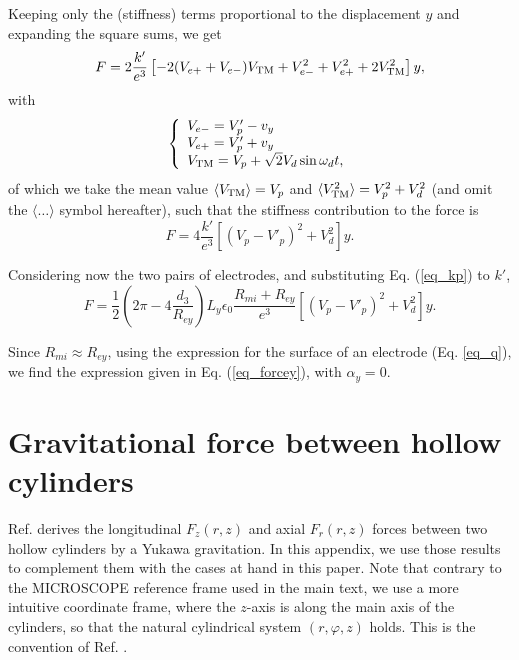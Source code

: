 \documentclass[12pt]{iopart}
\begin{document}
Keeping only the (stiffness) terms proportional to the displacement $y$ and expanding the square sums, we get
\begin{equation}
F = 2 \frac{k'}{e^3} \left[ -2 (V_{e+} + V_{e-}) V_{\rm TM} + V_{e-}^2 + V_{e+}^2 + 2V_{\rm TM}^2 \right] y,
\end{equation}
with \cite{liorzou20}
\begin{equation}
\left\{
\begin{array}{l}
V_{e-} = V'_p - v_y \\
V_{e+} = V'_p + v_y \\
V_{\rm TM} = V_p + \sqrt{2} V_d \sin \omega_d t,
\end{array}
\right.
\end{equation}
of which we take the mean value $\langle V_{\rm TM} \rangle = V_p$ and $\langle V_{\rm TM}^2 \rangle = V_p^2 + V_d^2$ (and omit the $\langle \dots \rangle$ symbol hereafter), such that the stiffness contribution to the force is
\begin{equation}
F = 4 \frac{k'}{e^3} \left[(V_p - V'_p)^2 + V_d^2\right] y.
\end{equation}

Considering now the two pairs of electrodes, and substituting Eq. (\ref{eq_kp}) to $k'$,
\begin{equation} \label{eq_Ftot}
F = \frac{1}{2} \left(2\pi - 4 \frac{d_3}{R_{ey}}\right) L_y \epsilon_0 \frac{R_{mi} + R_{ey}}{e^3} \left[(V_p - V'_p)^2 + V_d^2\right] y.
\end{equation}

Since $R_{mi} \approx R_{ey}$, using the expression for the surface of an electrode (Eq. \ref{eq_q}), we find the expression given in Eq. (\ref{eq_forcey}), with $\alpha_y=0$.


\section{Gravitational force between hollow cylinders} \label{appG}

Ref. \cite{lockerbie96} derives the longitudinal $F_z(r,z)$ and axial $F_r(r, z)$ forces between two hollow cylinders by a Yukawa gravitation. In this appendix, we use those results to complement them with the cases at hand in this paper. Note that contrary to the MICROSCOPE reference frame used in the main text, we use a more intuitive coordinate frame, where the $z$-axis is along the main axis of the cylinders, so that the natural cylindrical system $(r,\varphi,z)$ holds. This is the convention of Ref. \cite{lockerbie96}.
\end{document}
